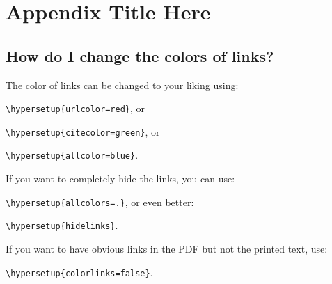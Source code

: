 
\chapter{Appendix Title Here} %

\label{AppendixX} %

\section{How do I change the colors of links?}

The color of links can be changed to your liking using:

{\small\verb!\hypersetup{urlcolor=red}!}, or

{\small\verb!\hypersetup{citecolor=green}!}, or

{\small\verb!\hypersetup{allcolor=blue}!}.

\noindent If you want to completely hide the links, you can use:

{\small\verb!\hypersetup{allcolors=.}!}, or even better: 

{\small\verb!\hypersetup{hidelinks}!}.

\noindent If you want to have obvious links in the PDF but not the printed text, use:

{\small\verb!\hypersetup{colorlinks=false}!}.